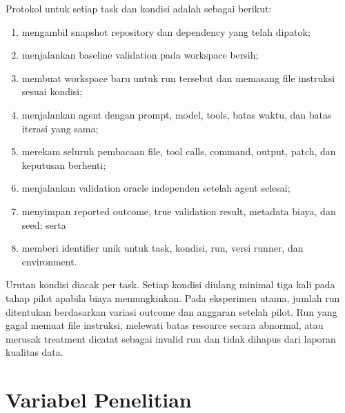 Protokol untuk setiap task dan kondisi adalah sebagai berikut:

\begin{enumerate}[leftmargin=*]
    \item mengambil snapshot repository dan dependency yang telah dipatok;
    \item menjalankan baseline validation pada workspace bersih;
    \item membuat workspace baru untuk run tersebut dan memasang file instruksi sesuai kondisi;
    \item menjalankan agent dengan prompt, model, tools, batas waktu, dan batas iterasi yang sama;
    \item merekam seluruh pembacaan file, tool calls, command, output, patch, dan keputusan berhenti;
    \item menjalankan validation oracle independen setelah agent selesai;
    \item menyimpan reported outcome, true validation result, metadata biaya, dan seed; serta
    \item memberi identifier unik untuk task, kondisi, run, versi runner, dan environment.
\end{enumerate}

Urutan kondisi diacak per task. Setiap kondisi diulang minimal tiga kali pada tahap pilot apabila biaya memungkinkan. Pada eksperimen utama, jumlah run ditentukan berdasarkan variasi outcome dan anggaran setelah pilot. Run yang gagal memuat file instruksi, melewati batas resource secara abnormal, atau merusak treatment dicatat sebagai invalid run dan tidak dihapus dari laporan kualitas data.

\section{Variabel Penelitian}

